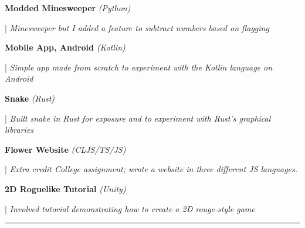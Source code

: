 \documentclass[letterpaper,11pt]{article}
\begin{document}
\begin{minipage}[t]{0.28\textwidth}
	\raggedright
	\textbf{ Modded Minesweeper }\textit{(Python)} \\
\end{minipage}
\hfill
\begin{minipage}[t]{0.70\textwidth}
	\raggedright
	|\textit{ Minesweeper but I added a feature to subtract numbers based on flagging} \\
\end{minipage}

\begin{minipage}[t]{0.28\textwidth}
	\raggedright
	\textbf{ Mobile App, Android }\textit{(Kotlin)} \\
\end{minipage}
\hfill
\begin{minipage}[t]{0.70\textwidth}
	\raggedright
	|\textit{ Simple app made from scratch to experiment with the Kotlin language on Android} \\
\end{minipage}

\begin{minipage}[t]{0.28\textwidth}
	\raggedright
	\textbf{ Snake }\textit{(Rust)}\\
\end{minipage}
\hfill
\begin{minipage}[t]{0.70\textwidth}
	\raggedright
	|\textit{ Built snake in Rust for exposure and to experiment with Rust's graphical libraries} \\
\end{minipage}

\begin{minipage}[t]{0.28\textwidth}
	\raggedright
	\textbf{ Flower Website }\textit{(CLJS/TS/JS)}\\
\end{minipage}
\hfill
\begin{minipage}[t]{0.70\textwidth}
	\raggedright
	|\textit{ Extra credit College assignment; wrote a website in three different JS languages.  } \\
\end{minipage}

\begin{minipage}[t]{0.28\textwidth}
	\raggedright
	\textbf{ 2D Roguelike Tutorial }\textit{(Unity)}\\
\end{minipage}
\hfill
\begin{minipage}[t]{0.70\textwidth}
	\raggedright
	|\textit{ Involved tutorial demonstrating how to create a 2D rouge-style game } \\
\end{minipage}
\noindent\rule{19.5cm}{0.4pt}
\end{document}
